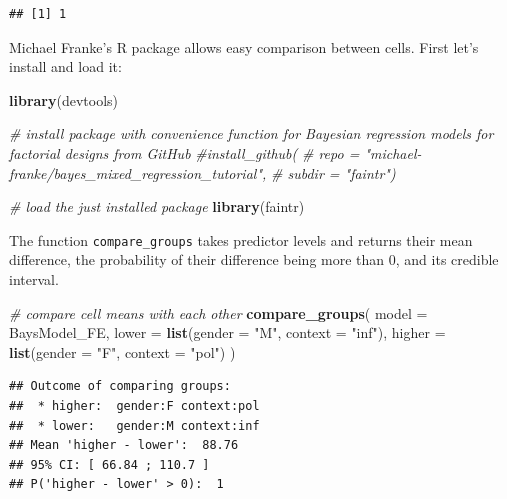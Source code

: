 \documentclass[]{book}
\newenvironment{Shaded}{\begin{snugshade}}{\end{snugshade}}
\newcommand{\CommentTok}[1]{\textcolor[rgb]{0.56,0.35,0.01}{\textit{#1}}}
\newcommand{\DataTypeTok}[1]{\textcolor[rgb]{0.13,0.29,0.53}{#1}}
\newcommand{\KeywordTok}[1]{\textcolor[rgb]{0.13,0.29,0.53}{\textbf{#1}}}
\newcommand{\NormalTok}[1]{#1}
\newcommand{\StringTok}[1]{\textcolor[rgb]{0.31,0.60,0.02}{#1}}
\begin{document}
\begin{verbatim}
## [1] 1
\end{verbatim}

Michael Franke's R package allows easy comparison between cells. First let's install and load it:

\begin{Shaded}
\begin{Highlighting}[]
\KeywordTok{library}\NormalTok{(devtools)}

\CommentTok{# install package with convenience function for Bayesian regression models for factorial designs from GitHub}
\CommentTok{#install_github(}
\CommentTok{#  repo = "michael-franke/bayes_mixed_regression_tutorial",}
\CommentTok{#  subdir = "faintr")}

\CommentTok{# load the just installed package}
\KeywordTok{library}\NormalTok{(faintr)}
\end{Highlighting}
\end{Shaded}

The function \texttt{compare\_groups} takes predictor levels and returns their mean difference, the probability of their difference being more than 0, and its credible interval.

\begin{Shaded}
\begin{Highlighting}[]
\CommentTok{# compare cell means with each other}
\KeywordTok{compare_groups}\NormalTok{(}
  \DataTypeTok{model =}\NormalTok{ BaysModel_FE,}
  \DataTypeTok{lower =} \KeywordTok{list}\NormalTok{(}\DataTypeTok{gender =} \StringTok{"M"}\NormalTok{, }\DataTypeTok{context =} \StringTok{"inf"}\NormalTok{),}
  \DataTypeTok{higher =} \KeywordTok{list}\NormalTok{(}\DataTypeTok{gender =} \StringTok{"F"}\NormalTok{, }\DataTypeTok{context =} \StringTok{"pol"}\NormalTok{)}
\NormalTok{)}
\end{Highlighting}
\end{Shaded}

\begin{verbatim}
## Outcome of comparing groups:
##  * higher:  gender:F context:pol 
##  * lower:   gender:M context:inf 
## Mean 'higher - lower':  88.76 
## 95% CI: [ 66.84 ; 110.7 ]
## P('higher - lower' > 0):  1
\end{verbatim}
\end{document}
